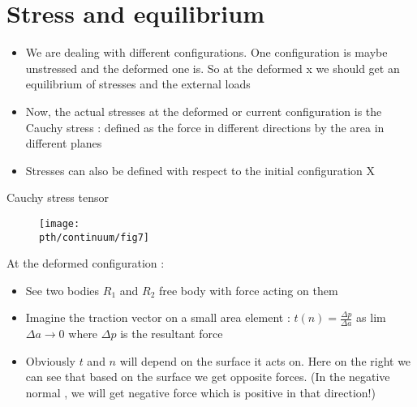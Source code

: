 

\section{Stress and equilibrium}

	\begin{frame}
		\begin{itemize}
		\item We are dealing with different configurations. One configuration is maybe unstressed and the deformed one is. So at the deformed x we should get an equilibrium of stresses and the external loads
		\item Now, the actual stresses at the deformed or current configuration is the Cauchy stress : defined as the force in different directions by the area in different planes
		\item Stresses can also be defined with respect to the initial configuration X			
					
		\end{itemize}

	\end{frame}

	\begin{frame}{Cauchy stress tensor}
		\begin{figure}
			\centering
			\texttt{[image: \\pth/continuum/fig7]}
		\end{figure}
		At the deformed configuration :
		\begin{itemize}
			\item See two bodies $R_1$ and $R_2$ free body with force acting on them
			\item Imagine the traction vector on a small area element : ${t(n) = \frac{\Delta p}{\Delta a}}$ as lim $\Delta a \rightarrow 0$ where $\Delta p$ is the resultant force
			\item Obviously $t$ and $n$ will depend on the surface it acts on. Here on the right we can see that based on the surface we get opposite forces. (In the negative normal , we will get negative force which is positive in that direction!)

		\end{itemize}
	\end{frame}

